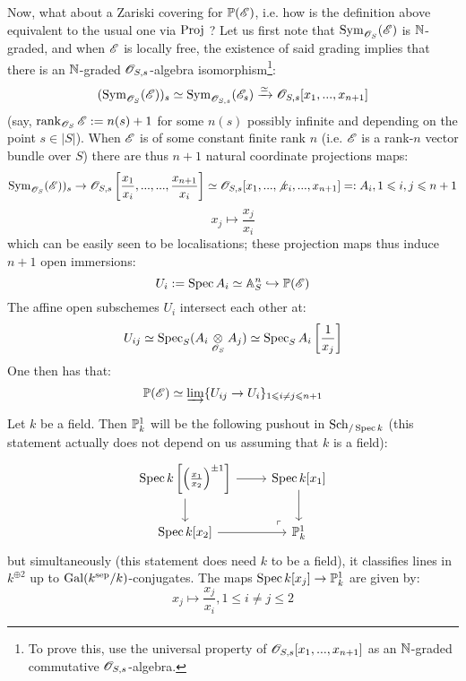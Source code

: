             Now, what about a Zariski covering for $\P(\scrE)$, i.e. how is the definition above equivalent to the usual one via $\Proj$ ? Let us first note that $\Sym_{\scrO_S}(\scrE)$ is $\N$-graded, and when $\scrE$ is locally free, the existence of said grading implies that there is an $\N$-graded $\scrO_{S, s}$-algebra isomorphism\footnote{To prove this, use the universal property of $\scrO_{S, s}[x_1, ..., x_{n + 1}]$ as an $\N$-graded commutative $\scrO_{S, s}$-algebra.}:
                $$(\Sym_{\scrO_S}(\scrE))_s \cong \Sym_{\scrO_{S, s}}(\scrE_s) \xrightarrow[]{\cong} \scrO_{S, s}[x_1, ..., x_{n + 1}]$$
            (say, $\rank_{\scrO_S} \scrE := n(s) + 1$ for some $n(s)$ possibly infinite and depending on the point $s \in |S|$). When $\scrE$ is of some constant finite rank $n$ (i.e. $\scrE$ is a rank-$n$ vector bundle over $S$) there are thus $n + 1$ natural coordinate projections maps:
                $$\Sym_{\scrO_S}(\scrE))_s \to \scrO_{S, s}\left[\frac{x_1}{x_i}, ..., ..., \frac{x_{n + 1}}{x_i}\right] \cong \scrO_{S, s}[x_1, ..., \not{x_i}, ..., x_{n + 1}] =: A_i, 1 \leq i, j \leq n + 1$$
                $$x_j \mapsto \frac{x_j}{x_i}$$
            which can be easily seen to be localisations; these projection maps thus induce $n + 1$ open immersions:
                $$U_i := \Spec A_i \cong \A^n_S \hookrightarrow \P(\scrE)$$
            The affine open subschemes $U_i$ intersect each other at:
                $$U_{ij} \cong \Spec_S ( A_i \tensor_{\scrO_S} A_j ) \cong \Spec_S A_i\left[\frac{1}{x_j}\right]$$
            One then has that:
                $$\P(\scrE) \cong \indlim\{U_{ij} \to U_i\}_{1 \leq i \not = j \leq n + 1}$$
            \begin{example}
                Let $k$ be a field. Then $\P^1_k$ will be the following pushout in $\Sch_{/\Spec k}$ (this statement actually does not depend on us assuming that $k$ is a field):
                    $$
                        \begin{tikzcd}
                    	{\Spec k\left[ \left( \frac{x_1}{x_2} \right)^{\pm 1} \right]} & {\Spec k[x_1]} \\
                    	{\Spec k[x_2]} & {\P^1_k}
                    	\arrow[from=1-1, to=2-1]
                    	\arrow[from=1-1, to=1-2]
                    	\arrow[from=1-2, to=2-2]
                    	\arrow[from=2-1, to=2-2]
                    	\arrow["\lrcorner"{anchor=center, pos=0.125, rotate=180}, draw=none, from=2-2, to=1-1]
                        \end{tikzcd}
                    $$
                but simultaneously (this statement does need $k$ to be a field), it classifies lines in $k^{\oplus 2}$ up to $\Gal(k^{\sep}/k)$-conjugates. The maps $\Spec k[x_j] \to \P^1_k$ are given by:
                    $$x_j \mapsto \frac{x_j}{x_i}, 1 \leq i \not = j \leq 2$$
            \end{example}

